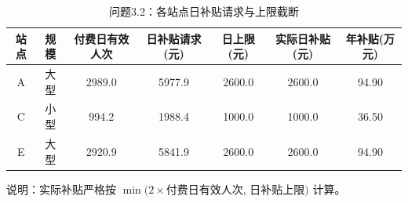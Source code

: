 \begin{table}[h]
\centering
\caption{问题3.2：各站点日补贴请求与上限截断}
\begin{tabular}{|c|c|c|c|c|c|c|}
\hline
站点 & 规模 & 付费日有效人次 & 日补贴请求(元) & 日上限(元) & 实际日补贴(元) & 年补贴(万元) \\
\hline
A & 大型 & 2989.0 & 5977.9 & 2600.0 & 2600.0 & 94.90 \\
C & 小型 & 994.2 & 1988.4 & 1000.0 & 1000.0 & 36.50 \\
E & 大型 & 2920.9 & 5841.9 & 2600.0 & 2600.0 & 94.90 \\
\hline
\end{tabular}
\vspace{0.2cm}
说明：实际补贴严格按 $\min(2\times$付费日有效人次, 日补贴上限$)$ 计算。
\end{table}